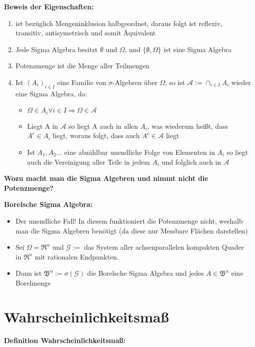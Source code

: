 \documentclass[a4paper,11pt]{scrartcl}
\begin{document}
\textbf{Beweis der Eigenschaften:}
\begin{enumerate}
    \item ist bezüglich Mengeninklusion halbgeordnet, daraus folgt ist reflexiv, transitiv, antisymetrisch und somit Äquivalent
    \item Jede Sigma Algebra besitzt $\emptyset$ und $\Omega$, und $\{\emptyset, \Omega\}$ ist eine Sigma Algebra
    \item Potenzmenge ist die Menge aller Teilmengen
    \item Ist $(A_i)_{i \in I}$ eine Familie von $\sigma$-Algebren über $\Omega$, so ist $\mathcal{A} := \cap_{i \in I} A_i$ wieder eine Sigma Algebra, da:
    \begin{itemize}
        \item $\Omega \in A_i \forall i \in I \Rightarrow \Omega \in \mathcal{A}$
        \item Liegt A in $\mathcal{A}$ so liegt A auch in allen $A_i$, was wiederum heißt, dass $A^c \in A_i$ liegt, woraus folgt, dass auch $A^c \in \mathcal{A}$ liegt
        \item Ist $A_1, A_2 \dots$ eine abzählbar unendliche Folge von Elementen in $A_i$ so liegt auch die Vereinigung aller Teile in jedem $A_i$ und folglich auch in $\mathcal{A}$
    \end{itemize}
\end{enumerate}

\textbf{Wozu macht man die Sigma Algebren und nimmt nicht die Potenzmenge?}

\textbf{Borelsche Sigma Algebra:}
\begin{itemize}
    \item Der unendliche Fall! In diesem funktioniert die Potenzmenge nicht, weshalb man die Sigma Algebren benötigt (da diese nur Messbare Flächen darstellen)
    \item Sei $\Omega = \mathfrak{R}^n$ und $\mathcal{G} := $ das System aller achsenparallelen kompakten Quader in $ \mathfrak{R}^n $ mit rationalen Endpunkten.
    \item Dann ist $\mathfrak{B}^n := \sigma(\mathcal{G})$ die Borelsche Sigma Algebra und jedes $A \in \mathfrak{B}^n$ eine Borelmenge
\end{itemize}

\section{Wahrscheinlichkeitsmaß}
\textbf{Definition Wahrscheinlichkeitsmaß:}
\end{document}
